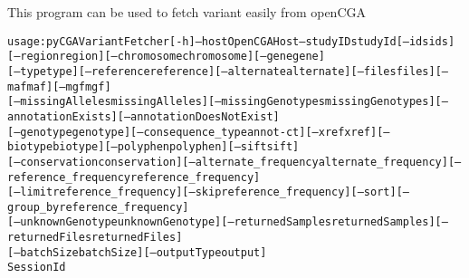 \documentclass[letterpaper,10pt,english]{sphinxmanual}
\begin{document}
This program can be used to fetch variant easily from openCGA

\begin{alltt}
usage: pyCGAVariantFetcher {[}-h{]} --host OpenCGA Host --studyID study Id {[}--ids ids{]} {[}--region region{]} {[}--chromosome chromosome{]} {[}--gene gene{]}
                           {[}--type type{]} {[}--reference reference{]} {[}--alternate alternate{]} {[}--files files{]} {[}--maf maf{]} {[}--mgf mgf{]}
                           {[}--missingAlleles missingAlleles{]} {[}--missingGenotypes missingGenotypes{]} {[}--annotationExists{]} {[}--annotationDoesNotExist{]}
                           {[}--genotype genotype{]} {[}--consequence\_type annot-ct{]} {[}--xref xref{]} {[}--biotype biotype{]} {[}--polyphen polyphen{]} {[}--sift sift{]}
                           {[}--conservation conservation{]} {[}--alternate\_frequency alternate\_frequency{]} {[}--reference\_frequency reference\_frequency{]}
                           {[}--limit reference\_frequency{]} {[}--skip reference\_frequency{]} {[}--sort{]} {[}--group\_by reference\_frequency{]}
                           {[}--unknownGenotype unknownGenotype{]} {[}--returnedSamples returnedSamples{]} {[}--returnedFiles returnedFiles{]}
                           {[}--batchSize batchSize{]} {[}--outputType output{]}
                           Session Id
\end{alltt}
\end{document}
